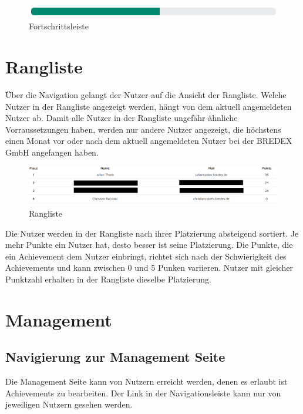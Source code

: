\documentclass[11pt]{article}
\begin{document}

\begin{figure}[H]
    \centering
    \includegraphics{application/progress_bar.png}
    \caption{Fortschrittsleiste}
\end{figure}

\section{Rangliste}
Über die Navigation gelangt der Nutzer auf die Ansicht der Rangliste. 
Welche Nutzer in der Rangliste angezeigt werden, hängt von dem aktuell angemeldeten Nutzer ab.
Damit alle Nutzer in der Rangliste ungefähr ähnliche Vorraussetzungen haben, werden nur andere Nutzer angezeigt,
die höchstens einen Monat vor oder nach dem aktuell angemeldeten Nutzer bei der BREDEX GmbH angefangen haben.

\begin{figure}[H]
    \centering
    \includegraphics[width=\textwidth]{application/ranking_table.png}
    \caption{Rangliste}
\end{figure}
Die Nutzer werden in der Rangliste nach ihrer Platzierung absteigend sortiert. Je mehr Punkte ein Nutzer hat, desto besser ist seine Platzierung.
Die Punkte, die ein Achievement dem Nutzer einbringt, richtet sich nach der Schwierigkeit des Achievements und kann zwischen 0 und 5 Punken variieren.
Nutzer mit gleicher Punktzahl erhalten in der Rangliste dieselbe Platzierung.



\section{Management}
\subsection{Navigierung zur Management Seite}
Die Management Seite kann von Nutzern erreicht werden, denen es erlaubt ist Achievements zu bearbeiten. Der Link in der Navigationsleiste kann nur von jeweiligen
Nutzern gesehen werden.
\end{document}
